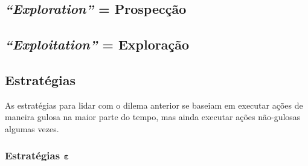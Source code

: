 \documentclass{article}
\begin{document}
            \subsection{\textit{``Exploration''} = Prospecção}
            
            \subsection{\textit{``Exploitation''} = Exploração}
        
        \subsection{Estratégias}
        
            As estratégias para lidar com o dilema anterior se baseiam em executar ações de maneira gulosa na maior parte do tempo, mas ainda executar ações não-gulosas algumas vezes.
        
            \subsubsection{Estratégias $\boldsymbol\varepsilon$}
            
\end{document}
